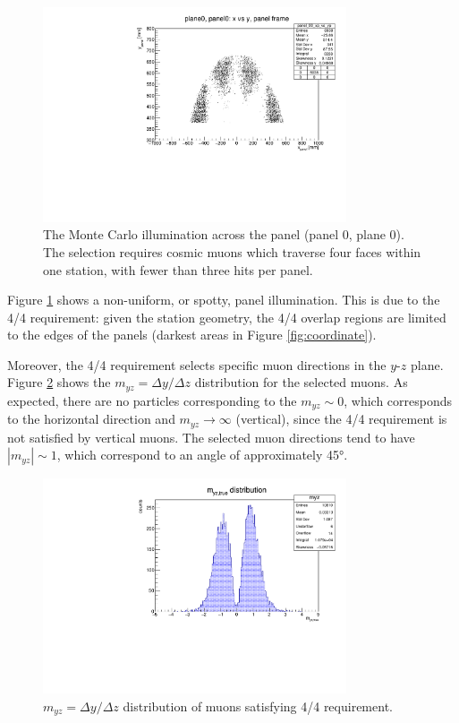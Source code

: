 \begin{figure}[!h]
    \centering
    \includegraphics[width =0.8\textwidth]{figures/pdf/xp_vs_yp_panel0.pdf}
    \caption[Monte Carlo illumination across 
    the panel (panel 0, plane 0).]{
        The Monte Carlo illumination 
        across the panel (panel 0, plane 0).
        The selection requires cosmic muons which 
        traverse four faces within one station, with 
        fewer than three hits per panel.}
    \label{fig:illumination}
\end{figure}
Figure \ref{fig:illumination} shows a 
non-uniform, or spotty, 
panel illumination. This is due to the 4/4 requirement: 
given the station geometry, the 4/4 overlap 
regions are limited to the edges of the panels (darkest 
areas in Figure \ref{fig:coordinate}). 

Moreover, the 4/4 requirement selects specific
muon directions in the $y$-$z$ plane. 
Figure \ref{fig:myz} shows the 
$m_{yz}=\Delta y /\Delta z$ distribution 
for the selected muons. 
As expected, there are no particles corresponding 
to the $m_{yz}\sim 0$, which corresponds to the  
horizontal direction and 
$m_{yz} \rightarrow \infty$ (vertical), since the 
4/4 requirement is not satisfied by vertical muons. 
The selected muon  
directions tend to have  
$|m_{yz}| \sim 1$, which correspond to  
an angle of approximately 45°.
\begin{figure}[!h]
    \centering
    \includegraphics[width =0.8\textwidth]{figures/pdf/myz.pdf}
    \caption[The $y-z$ direction 
    distribution of muons satisfying 4/4 requirement.]{
        $m_{yz}=\Delta y /\Delta z$  
    distribution of muons satisfying 4/4 requirement.}
    \label{fig:myz}
\end{figure}

